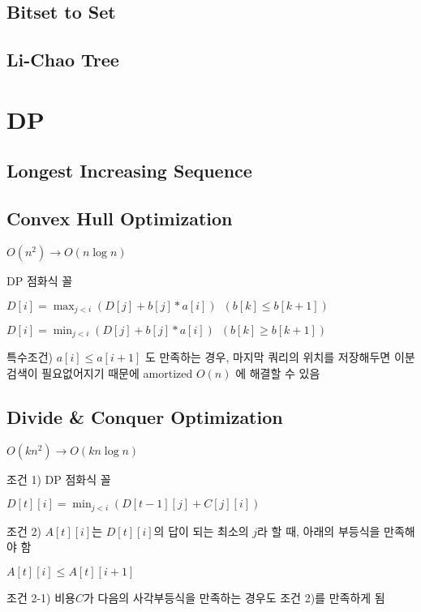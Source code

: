 \documentclass[8pt,landscape,a4paper,twocolumn]{article}
\begin{document}
\subsection{Bitset to Set}


\subsection{Li-Chao Tree}


\section{DP}
\subsection{Longest Increasing Sequence}


\subsection{Convex Hull Optimization}
$O(n^{2}) \to O(n\log{n})$

DP 점화식 꼴

$D[i] = \max_{j<i}( D[j] + b[j] * a[i] ) \phantom{1} (b[k] \leq b[k+1])$

$D[i] = \min_{j<i}( D[j] + b[j] * a[i] ) \phantom{1} (b[k] \geq b[k+1])$

특수조건) $a[i] \leq a[i+1]$ 도 만족하는 경우, 마지막 쿼리의 위치를 저장해두면 이분검색이 필요없어지기 때문에 amortized $O(n)$ 에 해결할 수 있음



\subsection{Divide \& Conquer Optimization}

$O(kn^{2}) \to O(kn\log{n})$

조건 1) DP 점화식 꼴

$D[t][i] = \min_{j<i}( D[t-1][j] + C[j][i] )$

조건 2) $A[t][i]$는 $D[t][i]$의 답이 되는 최소의 $j$라 할 때, 아래의 부등식을 만족해야 함

$A[t][i] \leq A[t][i+1]$

조건 2-1) 비용$C$가 다음의 사각부등식을 만족하는 경우도 조건 2)를 만족하게 됨
\end{document}
